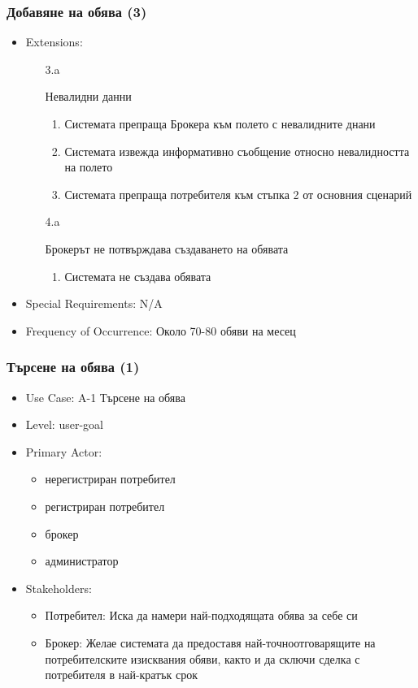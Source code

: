 \documentclass[12pt]{beamer}
\begin{document}
\begin{frame}[fragile]
\frametitle{Добавяне на обява (3)}
\begin{itemize}
	\item {Extensions:
		\begin{itemize}
        \item[3.a] {Невалидни данни
                \begin{enumerate}[1.]
                \item Системата препраща Брокера към полето с невалидните днани
                \item Системата извежда информативно съобщение относно невалидността на полето
                \item Системата препраща потребителя към стъпка 2 от основния сценарий
                \end{enumerate}
        }
        \item[4.a] {Брокерът не потвърждава създаването на обявата
                \begin{enumerate}[1.]
                \item Системата не създава обявата
                \end{enumerate}
        }
		\end{itemize}
	}                
	\item Special Requirements: N/A
	\item Frequency of Occurrence: Около 70-80 обяви на месец
\end{itemize}
\end{frame}

\begin{frame}[fragile]
\frametitle{Търсене на обява (1)}
\begin{itemize}
	\item Use Case: A-1 Търсене на обява
	\item Level: user-goal
	\item {Primary Actor:
		\begin{itemize}
			\item нерегистриран потребител
			\item регистриран потребител
			\item брокер
			\item администратор
		\end{itemize}
	}
	\item {Stakeholders:
		\begin{itemize}
			\item Потребител: Иска да намери най-подходящата обява за себе си
			\item Брокер: Желае системата да предоставя най-точноотговарящите на потребителските изисквания обяви, както и да сключи сделка с потребителя в най-кратък срок
		\end{itemize}
	}
\end{itemize}
\end{frame}
\end{document}
